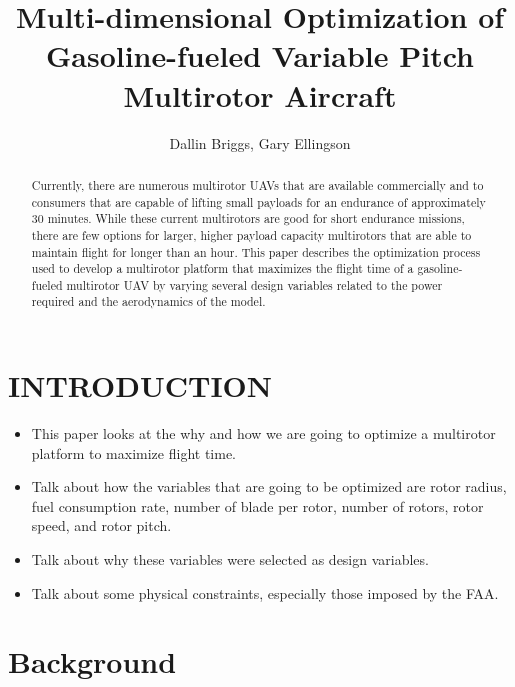 \documentclass[letterpaper, 10 pt, conference]{ieeeconf}  %
\title{\LARGE \bf
Multi-dimensional Optimization of Gasoline-fueled Variable Pitch Multirotor Aircraft
}
\author{Dallin Briggs, Gary Ellingson%
}
\begin{document}
\maketitle
\thispagestyle{empty}
\pagestyle{empty}


\begin{abstract}

Currently, there are numerous multirotor UAVs that are available commercially and to consumers that are capable of lifting small payloads for an endurance of approximately 30 minutes. While these current multirotors are good for short endurance missions, there are few options for larger, higher payload capacity multirotors that are able to maintain flight for longer than an hour. This paper describes the optimization process used to develop a multirotor platform that maximizes the flight time of a gasoline-fueled multirotor UAV by varying several design variables related to the power required and the aerodynamics of the model.

\end{abstract}


\section{INTRODUCTION}

\begin{itemize}
	\item{This paper looks at the why and how we are going to optimize a multirotor platform to maximize flight time.}
	\item{Talk about how the variables that are going to be optimized are rotor radius, fuel consumption rate, number of blade per rotor, number of rotors, rotor speed, and rotor pitch.}
	\item{Talk about why these variables were selected as design variables.}
	\item{Talk about some physical constraints, especially those imposed by the FAA.}
\end{itemize}





\section{Background}
\end{document}
